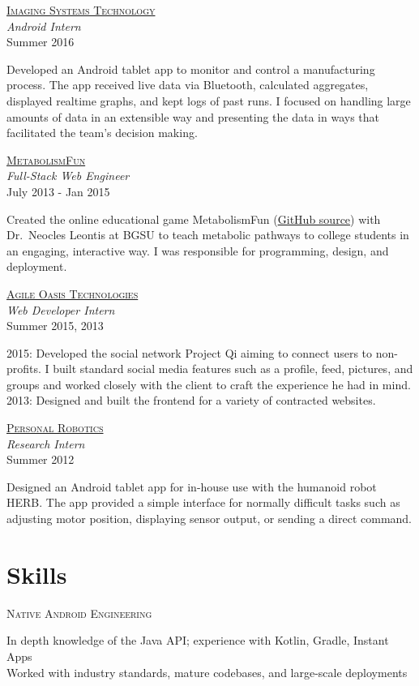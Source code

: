 \documentclass[letterpaper,10pt]{article}
\newcommand{\lb}{\vspace{4pt} \\}
\newenvironment{resumecols1}[1]
{
    \vspace{.1cm}
    \begin{minipage}[t]{.21\linewidth}
        \begin{flushright}
            \textsc{#1}
        \end{flushright}
    \end{minipage}
    \hspace{.005\linewidth}
    \begin{minipage}[t]{.77\linewidth}
}
{
    \end{minipage}
    \vspace{.1cm}
}
\newenvironment{resumecols}[4]
{
    \vspace{.1cm}
    \begin{minipage}[t]{.21\linewidth}
        \begin{flushright}
            \href{#2}{\textsc{#1}} \\
            \small{\textit{#3}} \\
            \small{#4}
        \end{flushright}
    \end{minipage}
    \hspace{.005\linewidth}
    \begin{minipage}[t]{.77\linewidth}
}
{
    \end{minipage}
    \vspace{.1cm}
}
\begin{document}
\begin{resumecols}{Imaging Systems Technology}{http://www.teamist.com}{Android Intern}{Summer 2016}
    Developed an Android tablet app to monitor and control a manufacturing process. The app received live data via Bluetooth, calculated aggregates, displayed realtime graphs, and kept logs of past runs. I focused on handling large amounts of data in an extensible way and presenting the data in ways that facilitated the team's decision making.
\end{resumecols}

\begin{resumecols}{MetabolismFun}{https://github.com/dzirbel/metabolism-fun}{Full-Stack Web Engineer}{July 2013 - Jan 2015}
    Created the online educational game MetabolismFun (\href{https://github.com/dzirbel/metabolism-fun}{\underline{GitHub source}}) with Dr.\ Neocles Leontis at BGSU to teach metabolic pathways to college students in an engaging, interactive way. I was responsible for programming, design, and deployment.
\end{resumecols}

\begin{resumecols}{Agile Oasis Technologies}{http://agileoasis.com}{Web Developer Intern}{Summer 2015, 2013}
    2015: Developed the social network Project Qi aiming to connect users to non-profits. I built standard social media features such as a profile, feed, pictures, and groups and worked closely with the client to craft the experience he had in mind.
    \lb
    2013: Designed and built the frontend for a variety of contracted websites.
\end{resumecols}

\begin{resumecols}{Personal Robotics}{https://personalrobotics.ri.cmu.edu}{Research Intern}{Summer 2012}
    Designed an Android tablet app for in-house use with the humanoid robot HERB. The app provided a simple interface for normally difficult tasks such as adjusting motor position, displaying sensor output, or sending a direct command.
\end{resumecols}

\section{Skills}

\begin{resumecols1}{Native Android Engineering}
    In depth knowledge of the Java API; experience with Kotlin, Gradle, Instant Apps \\
    Worked with industry standards, mature codebases, and large-scale deployments
\end{resumecols1}
\end{document}
